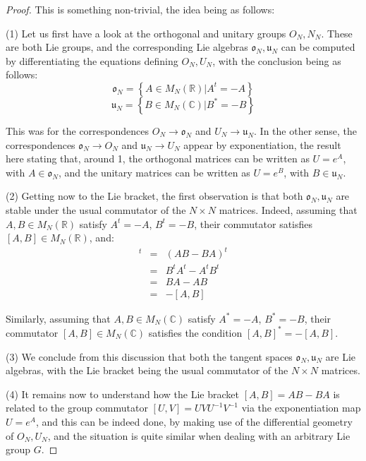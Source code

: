 \documentclass[12pt]{amsbook}
\begin{document}
\begin{proof}
This is something non-trivial, the idea being as follows:

\medskip

(1) Let us first have a look at the orthogonal and unitary groups $O_N,N_N$. These are both Lie groups, and the corresponding Lie algebras $\mathfrak o_N,\mathfrak u_N$ can be computed by differentiating the equations defining $O_N,U_N$, with the conclusion being as follows:
$$\mathfrak o_N=\left\{ A\in M_N(\mathbb R)\Big|A^t=-A\right\}$$
$$\mathfrak u_N=\left\{ B\in M_N(\mathbb C)\Big|B^*=-B\right\}$$

This was for the correspondences $O_N\to\mathfrak o_N$ and $U_N\to\mathfrak u_N$. In the other sense, the correspondences $\mathfrak o_N\to O_N$ and $\mathfrak u_N\to U_N$ appear by exponentiation, the result here stating that, around 1, the orthogonal matrices can be written as $U=e^A$, with $A\in\mathfrak o_N$, and the unitary matrices can be written as $U=e^B$, with $B\in\mathfrak u_N$.

\medskip

(2) Getting now to the Lie bracket, the first observation is that both $\mathfrak o_N,\mathfrak u_N$ are stable under the usual commutator of the $N\times N$ matrices. Indeed, assuming that $A,B\in M_N(\mathbb R)$ satisfy $A^t=-A$, $B^t=-B$, their commutator satisfies $[A,B]\in M_N(\mathbb R)$, and:
\begin{eqnarray*}
[A,B]^t
&=&(AB-BA)^t\\
&=&B^tA^t-A^tB^t\\
&=&BA-AB\\
&=&-[A,B]
\end{eqnarray*}

Similarly, assuming that $A,B\in M_N(\mathbb C)$ satisfy $A^*=-A$, $B^*=-B$, their commutator $[A,B]\in M_N(\mathbb C)$ satisfies the condition $[A,B]^*=-[A,B]$.

\medskip

(3) We conclude from this discussion that both the tangent spaces $\mathfrak o_N,\mathfrak u_N$ are Lie algebras, with the Lie bracket being the usual commutator of the $N\times N$ matrices. 

\medskip

(4) It remains now to understand how the Lie bracket $[A,B]=AB-BA$ is related to the group commutator $[U,V]=UVU^{-1}V^{-1}$ via the exponentiation map $U=e^A$, and this can be indeed done, by making use of the differential geometry of $O_N,U_N$, and the situation is quite similar when dealing with an arbitrary Lie group $G$.
\end{proof}
\end{document}
